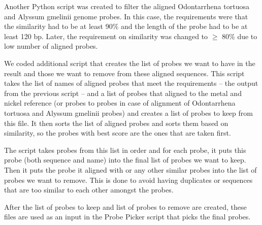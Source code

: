 Another Python script was created to filter the aligned Odontarrhena tortuosa and Alyssum gmelinii genome probes. In this case, the requirements were that the similarity had to be at least 90\% and the length of the probe had to be at least 120 bp. Later, the requirement on similarity was changed to $\geq$ 80\% due to low number of aligned probes. 

We coded additional script that creates the list of probes we want to have in the result and those we want to remove from these aligned sequences. 
This script takes the list of names of aligned probes that meet the requirements -- the output from the previous script -- and a list of probes that aligned to the metal and nickel reference (or probes to probes in case of alignment of Odontarrhena tortuosa and Alyssum gmelinii probes) and creates a list of probes to keep from this file. It then sorts the list of aligned probes and sorts them based on similarity, so the 
probes with best score are the ones that are taken first. 

The script takes probes from this list in order and for each probe, it puts this probe (both sequence and name) into the final list of probes we want to keep. Then it puts the probe it aligned with or any other 
similar probes into the list of probes we want to remove. This is done to avoid having duplicates or sequences that are too similar to each other amongst the probes. 

After the list of probes to keep and list of probes to remove are created, these files are used as an input in the Probe Picker script that picks the final probes. 


